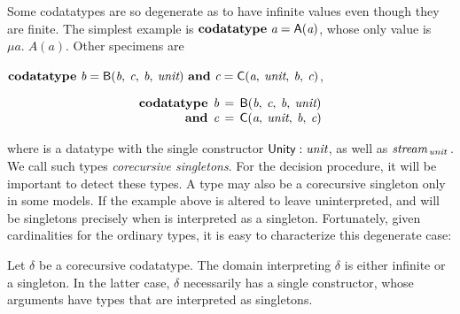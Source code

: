 Some codatatypes are so degenerate as to have infinite values
even though they are finite. The simplest example is
\vthinspace$\textbf{codatatype}~\textit{a} = \textsf{A}(\textit{a})$, whose
only value is $\mu a.\; A(a)$. Other specimens are
\begin{paper}%
\vthinspace$\textbf{codatatype}~\textit{b} = \textsf{B}(\textit{b},\: \textit{c},\: \textit{b},\: \textit{unit})
~\textbf{and}~ \textit{c} = \textsf{C}(\textit{a},\: \textit{unit},\: \textit{b},\: \textit{c})$,
\end{paper}%
\begin{report}%
\[\begin{aligned}[t]
      \textbf{codatatype}\;\, \textit{b} & \,=\, \textsf{B}(\textit{b},\: \textit{c},\: \textit{b},\: \textit{unit}) \\[-1\jot]
      \textbf{and}\;\, \textit{c} & \,=\, \textsf{C}(\textit{a},\: \textit{unit},\: \textit{b},\: \textit{c})
\end{aligned}
\]
\end{report}
where  is a datatype with the single constructor $\textsf{Unity} :
\textit{unit}$, as well as $\textit{stream}_{\,\textit{unit}\,}$. We call such types
\emph{corecursive singletons}. For the decision procedure, it will be
important to detect these types. %
A type may also be a corecursive singleton only in some models. If the example
above is altered to leave  uninterpreted,  and  will be
singletons precisely when  is interpreted as a singleton.
Fortunately, given cardinalities for the ordinary types, it is easy to
characterize this degenerate case:


\begin{lemma}%
\label{lem:corecursive-singletons}%
\afterDot
Let $\delta$ be a corecursive codatatype. The domain interpreting $\delta$ is
either infinite or a singleton. In the latter case, $\delta$ necessarily has a
single constructor, whose arguments have types that are interpreted as
singletons.
\end{lemma}

